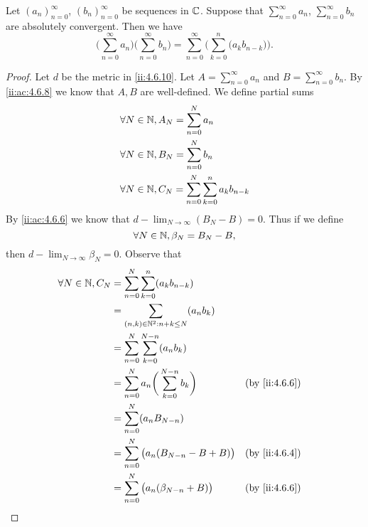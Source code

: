 \begin{ac}\label{ii:ac:4.6.9}
  Let \((a_n)_{n = 0}^\infty\), \((b_n)_{n = 0}^\infty\) be sequences in \(\mathbb{C}\).
  Suppose that \(\sum_{n = 0}^\infty a_n\), \(\sum_{n = 0}^\infty b_n\) are absolutely convergent.
  Then we have
  \[
    \bigg(\sum_{n = 0}^\infty a_n\bigg) \bigg(\sum_{n = 0}^\infty b_n\bigg) = \sum_{n = 0}^\infty \bigg(\sum_{k = 0}^n \big(a_k b_{n - k}\big)\bigg).
  \]
\end{ac}

\begin{proof}
  Let \(d\) be the metric in \cref{ii:4.6.10}.
  Let \(A = \sum_{n = 0}^\infty a_n\) and \(B = \sum_{n = 0}^\infty b_n\).
  By \cref{ii:ac:4.6.8} we know that \(A, B\) are well-defined.
  We define partial sums
  \begin{align*}
     & \forall N \in \mathbb{N}, A_N = \sum_{n = 0}^N a_n                          \\
     & \forall N \in \mathbb{N}, B_N = \sum_{n = 0}^N b_n                          \\
     & \forall N \in \mathbb{N}, C_N = \sum_{n = 0}^N \sum_{k = 0}^n a_k b_{n - k}
  \end{align*}
  By \cref{ii:ac:4.6.6} we know that \(d - \lim_{N \to \infty} (B_N - B) = 0\).
  Thus if we define
  \[
    \forall N \in \mathbb{N}, \beta_N = B_N - B,
  \]
  then \(d - \lim_{N \to \infty} \beta_N = 0\).
  Observe that
  \begin{align*}
    \forall N \in \N, C_N & = \sum_{n = 0}^N \sum_{k = 0}^n (a_k b_{n - k})                                            \\
                          & = \sum_{(n, k) \in \N^2 : n + k \leq N} (a_n b_k)                                          \\
                          & = \sum_{n = 0}^N \sum_{k = 0}^{N - n} (a_n b_k)                                            \\
                          & = \sum_{n = 0}^N a_n \bigg(\sum_{k = 0}^{N - n} b_k\bigg)               &  & \by{ii:4.6.6} \\
                          & = \sum_{n = 0}^N (a_n B_{N - n})                                                           \\
                          & = \sum_{n = 0}^N \big(a_n (B_{N - n} - B + B)\big)                      &  & \by{ii:4.6.4} \\
                          & = \sum_{n = 0}^N \big(a_n (\beta_{N - n} + B)\big)                      &  & \by{ii:4.6.6} \\

\end{align*}
\end{proof}
